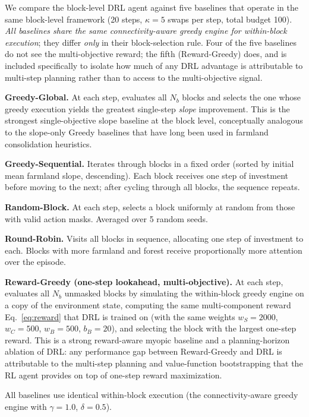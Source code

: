 \documentclass[preprint,12pt]{elsarticle}
\begin{document}
We compare the block-level DRL agent against five baselines that operate in the same block-level framework (20 steps, $\kappa = 5$ swaps per step, total budget 100). \textit{All baselines share the same connectivity-aware greedy engine for within-block execution}; they differ \textit{only} in their block-selection rule. Four of the five baselines do not see the multi-objective reward; the fifth (Reward-Greedy) does, and is included specifically to isolate how much of any DRL advantage is attributable to multi-step planning rather than to access to the multi-objective signal.

\textbf{Greedy-Global.} At each step, evaluates all $N_b$ blocks and selects the one whose greedy execution yields the greatest single-step \textit{slope} improvement. This is the strongest single-objective slope baseline at the block level, conceptually analogous to the slope-only Greedy baselines that have long been used in farmland consolidation heuristics.

\textbf{Greedy-Sequential.} Iterates through blocks in a fixed order (sorted by initial mean farmland slope, descending). Each block receives one step of investment before moving to the next; after cycling through all blocks, the sequence repeats.

\textbf{Random-Block.} At each step, selects a block uniformly at random from those with valid action masks. Averaged over 5 random seeds.

\textbf{Round-Robin.} Visits all blocks in sequence, allocating one step of investment to each. Blocks with more farmland and forest receive proportionally more attention over the episode.

\textbf{Reward-Greedy (one-step lookahead, multi-objective).} At each step, evaluates all $N_b$ unmasked blocks by simulating the within-block greedy engine on a copy of the environment state, computing the same multi-component reward Eq.~\ref{eq:reward} that DRL is trained on (with the same weights $w_S=2000$, $w_C=500$, $w_B=500$, $b_B=20$), and selecting the block with the largest one-step reward. This is a strong reward-aware myopic baseline and a planning-horizon ablation of DRL: any performance gap between Reward-Greedy and DRL is attributable to the multi-step planning and value-function bootstrapping that the RL agent provides on top of one-step reward maximization.

All baselines use identical within-block execution (the connectivity-aware greedy engine with $\gamma = 1.0$, $\delta = 0.5$).
\end{document}
